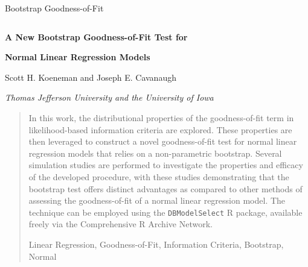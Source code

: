 \documentclass[12pt]{article} %
\theoremstyle{definition}
\begin{document}


\renewcommand{\baselinestretch}{2}


{\hfill {\footnotesize\rm Bootstrap Goodness-of-Fit} \hfill}

\renewcommand{\thefootnote}{}
$\ $\par


\fontsize{12}{14pt plus.8pt minus .6pt}\selectfont \vspace{0.8pc}
\centerline{\large\bf A New Bootstrap Goodness-of-Fit Test for}
\vspace{2pt} 
\centerline{\large\bf Normal Linear Regression Models}
\vspace{.4cm} 
\centerline{Scott H. Koeneman and Joseph E. Cavanaugh} 
\vspace{.4cm} 
\centerline{\it Thomas Jefferson University and the University of Iowa}
 \vspace{.55cm} \fontsize{9}{11.5pt plus.8pt minus.6pt}\selectfont


\begin{quotation}
In this work, the distributional properties of the goodness-of-fit term in likelihood-based information criteria are explored. These properties are then leveraged
to construct a novel goodness-of-fit test for normal linear regression models that relies on a non-parametric bootstrap. Several simulation studies are performed to
investigate the properties and efficacy of the developed procedure, with these studies demonstrating that the bootstrap test offers distinct advantages as compared
to other methods of assessing the goodness-of-fit of a normal linear regression model. The technique can be employed using the \verb|DBModelSelect| R package,
available freely via the Comprehensive R Archive Network.


\vspace{9pt}
Linear Regression, Goodness-of-Fit, Information Criteria, Bootstrap, Normal
\par
\end{quotation}\par
\end{document}
